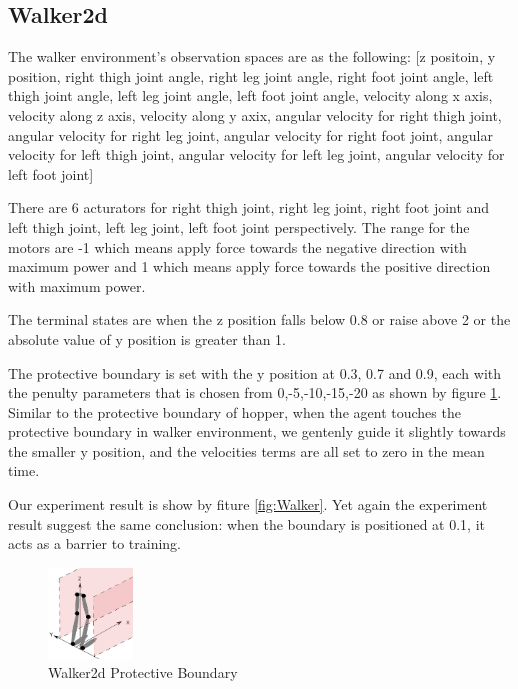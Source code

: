 \documentclass[journal]{IEEEtran}
\begin{document}
\subsection{Walker2d}
The walker environment's observation spaces are as the following: [z positoin, y position, right thigh joint angle, right leg joint angle, right foot joint angle, left thigh joint angle, left leg joint angle, left foot joint angle, velocity along x axis, velocity along z axis, velocity along y axix, angular velocity for right thigh joint, angular velocity for right leg joint, angular velocity for right foot joint, angular velocity for left thigh joint, angular velocity for left leg joint, angular velocity for left foot joint]

There are 6 acturators for right thigh joint, right leg joint, right foot joint and left thigh joint, left leg joint, left foot joint perspectively. The range for the motors are -1 which means apply force towards the negative direction with maximum power and 1 which means apply force towards the positive direction with maximum power.

The terminal states are when the z position falls below 0.8 or raise above 2 or the absolute value of y position is greater than 1.

The protective boundary is set with the y position at 0.3, 0.7 and 0.9, each with the penulty parameters that is chosen from 0,-5,-10,-15,-20 as shown by figure \ref{fig:walkerPB}. Similar to the protective boundary of hopper, when the agent touches the protective boundary in walker environment, we gentenly guide it slightly towards the smaller y position, and the velocities terms are all set to zero in the mean time.

Our experiment result is show by fiture \ref{fig:Walker}. Yet again the experiment result suggest the same conclusion: when the boundary is positioned at 0.1, it acts as a barrier to training.

\begin{figure}
     \centering
      \includegraphics[width=0.2\textwidth]{walker.png}
      \caption{Walker2d Protective Boundary}
      \label{fig:walkerPB}
\end{figure}
\end{document}
